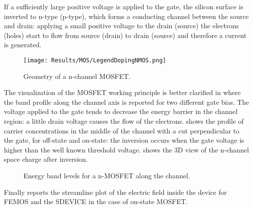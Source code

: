 If a sufficiently large positive voltage is applied to the gate, the silicon surface is inverted to n-type (p-type), which forms a conducting channel between the source and drain: applying a small positive voltage to the drain (source) the electrons (holes) start to flow from source (drain) to drain (source) and therefore a current is generated. 

\begin{figure}[!b]
\centering
{}
\hspace{0.06\textwidth}
{\texttt{[image: Results/MOS/LegendDopingNMOS.png]}}
\caption{Geometry of a n-channel MOSFET.}
\label{fig: mos geometry}
\end{figure}




The visualization of the MOSFET working principle is better clarified in  where the band profile along the channel axis is reported for two different gate bias.
The voltage applied to the gate tends to decrease the energy barrier in the channel region: a little drain voltage causes the flow of the electrons.
 shows the profile of carrier concentrations in the middle of the channel with a cut perpendicular to the gate, for off-state and on-state: the inversion occurs when the gate voltage is higher than the well known threshold voltage.
 shows the 3D view of the n-channel space charge after inversion.



\begin{figure}[!t]
\centering
{}
\caption{Energy band levels for a n-MOSFET along the channel.}
\label{fig: energy levels MOS}
\end{figure}

Finally  reports the streamline plot of the electric field inside the device for FEMOS and the SDEVICE in the case of on-state MOSFET.


